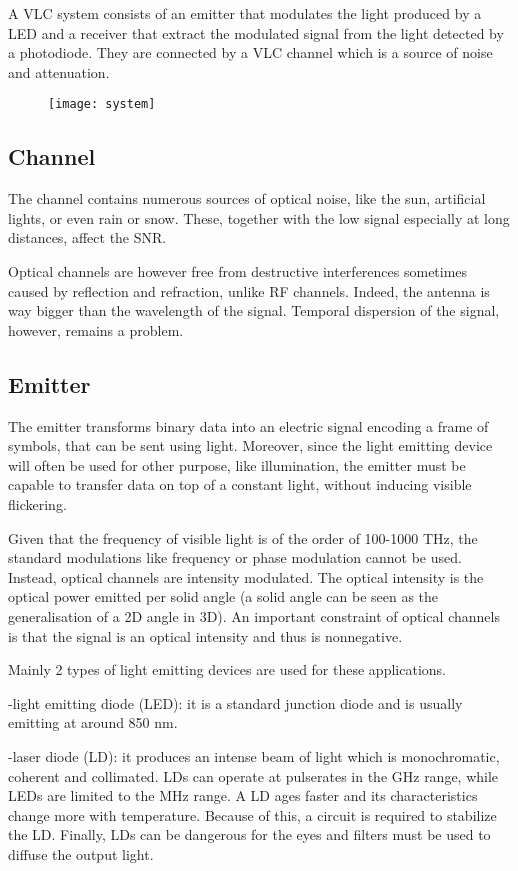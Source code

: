 \documentclass[12pt]{report}
\begin{document}
A VLC system consists of an emitter that modulates the light produced by a LED and a receiver that extract the modulated signal from the light detected by a photodiode. They are connected by a VLC channel which is a source of noise and attenuation.

\begin{figure}[h]
\centering
\texttt{[image: system]}
\end{figure}

\subsection{Channel}

The channel contains numerous sources of optical noise, like the sun, artificial lights, or even rain or snow. These, together with the low signal especially at long distances, affect the SNR.

Optical channels are however free from destructive interferences sometimes caused by reflection and refraction, unlike RF channels. Indeed, the antenna is way bigger than the wavelength of the signal. Temporal dispersion of the signal, however, remains a problem.

\subsection{Emitter}

The emitter transforms binary data into an electric signal encoding a frame of symbols, that can be sent using light. Moreover, since the light emitting device will often be used for other purpose, like illumination, the emitter must be capable to transfer data on top of a constant light, without inducing visible flickering.

Given that the frequency of visible light is of the order of 100-1000 THz, the standard modulations like frequency or phase modulation cannot be used. Instead, optical channels are intensity modulated. The optical intensity is the optical power emitted per solid angle (a solid angle can be seen as the generalisation of a 2D angle in 3D). An important constraint of optical channels is that the signal is an optical intensity and thus is nonnegative.

Mainly 2 types of light emitting devices are used for these applications.

-light emitting diode (LED): it is a standard junction diode and is usually emitting at around 850 nm.

-laser diode (LD): it produces an intense beam of light which is monochromatic, coherent and collimated.
LDs can operate at pulserates in the GHz range, while LEDs are limited to the MHz range. A LD ages faster and its characteristics change more with temperature. Because of this, a circuit is required to stabilize the LD. Finally, LDs can be dangerous for the eyes and filters must be used to diffuse the output light.
\end{document}
